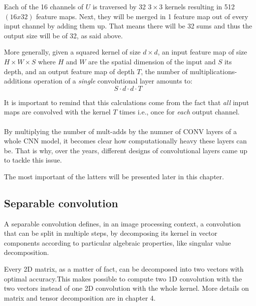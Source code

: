  Each of the 16 channels of $U$ is traversed by 32 $3\times3$ kernels resulting in 512 $(16x32)$ feature maps. Next, they will be merged in 1 feature map out of every input channel by adding them up. That means there will be 32 sums and thus the output size will be of 32, as said above. 
 \newline 
 
 More generally, given a squared kernel of size $d \times d$, an input feature map of size $H \times W \times S$ where $H$ and $W$ are the spatial dimension of the input and $S$ its depth, and an output feature map of depth $T$, the number of multiplications-additions operation of a \emph{single} convolutional layer amounts to: 
 \begin{equation}
    S\cdot d \cdot d \cdot T 
 \end{equation}
 
 It is important to remind that this calculations come from the fact that \emph{all} input maps are convolved with the kernel $T$ times i.e., once for \emph{each} output channel. \\
 \\
 
 By multiplying the number of mult-adds by the numner of CONV layers of a whole CNN model, it becomes clear how computationally heavy these layers can be. That is why, over the years, different designs of convolutional layers came up to tackle this issue. 
 \newline 
 
The most important of the latters will be presented later in this chapter.  



\subsection{Separable convolution}
\label{subsec:separable}
A separable convolution defines, in an image processing context, a convolution that can be split in multiple steps, by decomposing its kernel in vector components according to particular algebraic properties, like singular value decomposition. 

Every 2D matrix, as a matter of fact, can be decomposed into two vectors with optimal accuracy.This makes possible to compute two 1D convolution with the two vectors instead of one 2D convolution with the whole kernel. More details on matrix and tensor decomposition are in chapter 4. 

